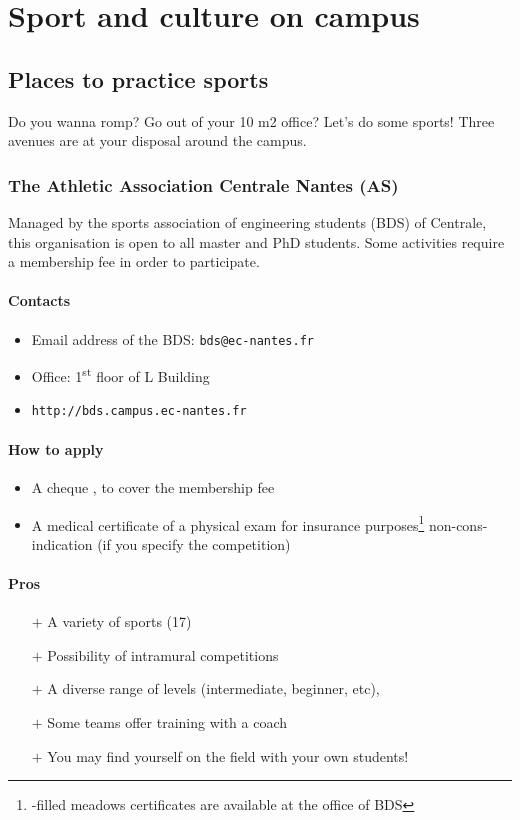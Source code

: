 \section{Sport and culture on campus}
\subsection {Places to practice sports}
Do you wanna romp? Go out of your 10 m2 office?  Let's do some sports! Three avenues are at your disposal around the campus.

\subsubsection{The Athletic Association Centrale Nantes (AS)}
Managed by the sports association of engineering students (BDS) of Centrale, this organisation is open to all master and PhD students. Some activities require a membership fee in order to participate.\paragraph{Contacts}
\begin{itemize}
  \item Email address of the BDS: \texttt{bds@ec-nantes.fr}
  \item Office: 1\textsuperscript{st} floor of L Building
  \item \texttt{http://bds.campus.ec-nantes.fr}
\end {itemize}
\paragraph{How to apply}
\begin{itemize}
  \item A cheque , to cover the membership fee
  \item A medical certificate of a physical exam for insurance purposes\footnote{-filled meadows certificates are available at the office of BDS} non-cons-indication (if you specify the competition)
\end{itemize}

\paragraph{Pros}
\begin{itemize}
  \item [$+$] A variety of sports (17)
  \item [$+$] Possibility of intramural competitions
  \item [$+$] A diverse range of levels (intermediate, beginner, etc),
  \item [$+$] Some teams offer training with a coach
  \item [$+$] You may find yourself on the field with your own students!
\end{itemize}
